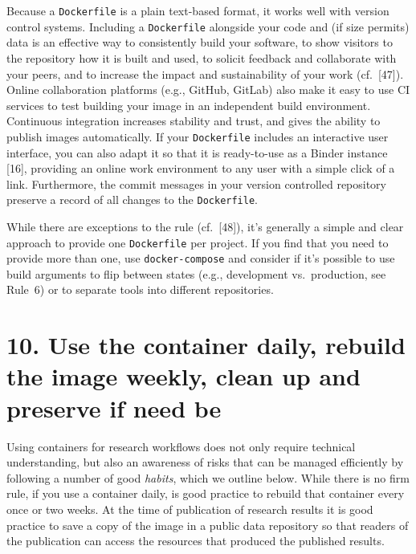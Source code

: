 \documentclass[10pt,letterpaper]{article}
\begin{document}
Because a \texttt{Dockerfile} is a plain text-based format, it works
well with version control systems. Including a \texttt{Dockerfile}
alongside your code and (if size permits) data is an effective way to
consistently build your software, to show visitors to the repository how
it is built and used, to solicit feedback and collaborate with your
peers, and to increase the impact and sustainability of your work
(cf.~{[}47{]}). Online collaboration platforms (e.g., GitHub, GitLab)
also make it easy to use CI services to test building your image in an
independent build environment. Continuous integration increases
stability and trust, and gives the ability to publish images
automatically. If your \texttt{Dockerfile} includes an interactive user
interface, you can also adapt it so that it is ready-to-use as a Binder
instance {[}16{]}, providing an online work environment to any user with
a simple click of a link. Furthermore, the commit messages in your
version controlled repository preserve a record of all changes to the
\texttt{Dockerfile}.

While there are exceptions to the rule (cf.~{[}48{]}), it's generally a
simple and clear approach to provide one \texttt{Dockerfile} per
project. If you find that you need to provide more than one, use
\texttt{docker-compose} and consider if it's possible to use build
arguments to flip between states (e.g., development vs.~production, see
Rule~6) or to separate tools into different repositories.

\hypertarget{use-the-container-daily-rebuild-the-image-weekly-clean-up-and-preserve-if-need-be}{%
\section*{10. Use the container daily, rebuild the image weekly, clean
up and preserve if need
be}\label{use-the-container-daily-rebuild-the-image-weekly-clean-up-and-preserve-if-need-be}}

Using containers for research workflows does not only require technical
understanding, but also an awareness of risks that can be managed
efficiently by following a number of good \emph{habits}, which we
outline below. While there is no firm rule, if you use a container
daily, is good practice to rebuild that container every once or two
weeks. At the time of publication of research results it is good
practice to save a copy of the image in a public data repository so that
readers of the publication can access the resources that produced the
published results.
\end{document}
